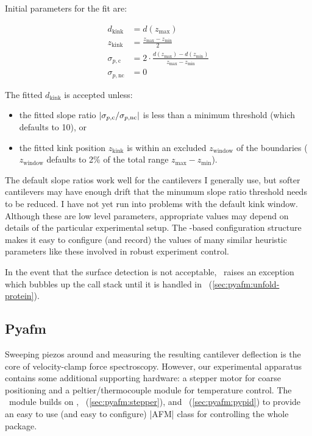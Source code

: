 Initial parameters for the fit are:

\begin{align}
  d_\text{kink} &= d(z_\text{max}) \\
  z_\text{kink} &= \frac{z_\text{max} - z_\text{min}}{2} \\
  \sigma_{p,\text{c}} &= 2\cdot
     \frac{d(z_\text{max}) - d(z_\text{min})}{z_\text{max} - z_\text{min}} \\
  \sigma_{p,\text{nc}} &= 0
\end{align}

The fitted $d_\text{kink}$ is accepted unless:

\begin{itemize}
  \item the fitted slope ratio
    $\lvert {\sigma_{p,\text{c}}/\sigma_{p,\text{nc}}} \rvert$ is less than a
    minimum threshold (which defaults to 10), or
  \item the fitted kink position $z_\text{kink}$ is within an excluded
    $z_\text{window}$ of the boundaries ($z_\text{window}$ defaults to
    2\% of the total range $z_\text{max} - z_\text{min}$).
\end{itemize}

The default slope ratios work well for the cantilevers I generally
use, but softer cantilevers may have enough drift that the minumum
slope ratio threshold needs to be reduced.  I have not yet run into
problems with the default kink window.  Although these are low level
parameters, appropriate values may depend on details of the particular
experimental setup.  The \hFconfig-based configuration structure makes
it easy to configure (and record) the values of many similar heuristic
parameters like these involved in robust experiment control.

In the event that the surface detection is not acceptable,
\pypiezo\ raises an exception which bubbles up the call stack until it
is handled in \unfoldprotein\ (\cref{sec:pyafm:unfold-protein}).

\subsection{Pyafm}
\label{sec:pyafm:pyafm}

Sweeping piezos around and measuring the resulting cantilever
deflection is the core of velocity-clamp force spectroscopy.  However,
our experimental apparatus contains some additional supporting
hardware: a stepper motor for coarse positioning and a
peltier/thermocouple module for temperature control.  The
\pyafm\ module builds on \pypiezo,
\stepper\ (\cref{sec:pyafm:stepper}), and
\pypid\ (\cref{sec:pyafm:pypid}) to provide an easy to use (and easy
to configure) |AFM| class for controlling the whole
package.

